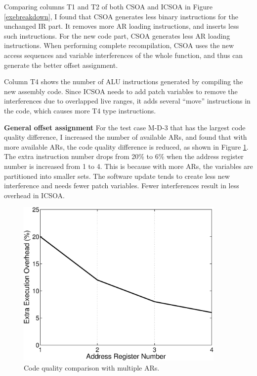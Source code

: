 Comparing columns T1 and T2 of both CSOA and ICSOA in Figure \ref{exebreakdown}, I found that CSOA generates less binary instructions for the unchanged IR part. It removes more AR loading instructions, and inserts less such instructions. For the new code part, CSOA generates less AR loading instructions. When performing complete recompilation, CSOA uses the new access sequences and variable interferences of the whole function, and thus can generate the better offset assignment.

Column T4 shows the number of ALU instructions generated by compiling the new assembly code.  Since ICSOA needs to add patch variables to remove the interferences due to overlapped live ranges, it adds several ``move'' instructions in the code, which causes more T4 type instructions.

\textbf{General offset assignment} For the test case M-D-3 that has the largest code quality difference, I increased the number of available ARs, and found that with more available ARs, the code quality difference is reduced, as shown in Figure \ref{exe_ar}. The extra instruction number drops from 20\% to 6\% when the address register number is increased from 1 to 4. 
This is because with more ARs, the variables are partitioned into smaller sets. The software update tends to create less new interference and needs fewer patch variables. Fewer interferences result in less overhead in ICSOA. 

\begin{figure}[htbp]
\begin{center}
\includegraphics[width=4in]{./figures/exe_ar.eps}
\caption{Code quality comparison with multiple ARs.}
\label{exe_ar}
\end{center}
\vspace{-0.2in}
\end{figure}

